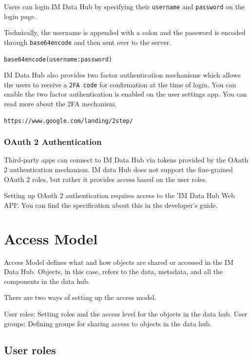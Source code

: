 \documentclass[]{book}
\begin{document}
Users can login IM Data Hub by specifying their \texttt{username} and \texttt{password} on the login page.

Technically, the username is appended with a colon and the password is encoded through \texttt{base64encode} and then sent over to the server.

\texttt{base64encode(username:password)}

IM Data Hub also provides two factor authentication mechanisms which allows the users to receive a \texttt{2FA\ code} for confirmation at the time of login. You can enable the two factor authentication is enabled on the user settings app. You can read more about the 2FA mechanism.

\texttt{https://www.google.com/landing/2step/}

\hypertarget{oauth-2-authentication}{%
\subsubsection{OAuth 2 Authentication}\label{oauth-2-authentication}}

Third-party apps can connect to IM Data Hub via tokens provided by the OAuth 2 authentication mechanism. IM data Hub does not support the fine-grained OAuth 2 roles, but rather it provides access based on the user roles.

Setting up OAuth 2 authentication requires access to the 'IM Data Hub Web API`. You can find the specification about this in the developer's guide.

\hypertarget{access-model}{%
\section{Access Model}\label{access-model}}

Access Model defines what and how objects are shared or accessed in the IM Data Hub. Objects, in this case, refers to the data, metadata, and all the components in the data hub.

There are two ways of setting up the access model.

User roles: Setting roles and the access level for the objects in the data hub.
User groups: Defining groups for sharing access to objects in the data hub.

\hypertarget{user-roles}{%
\subsection{User roles}\label{user-roles}}
\end{document}
